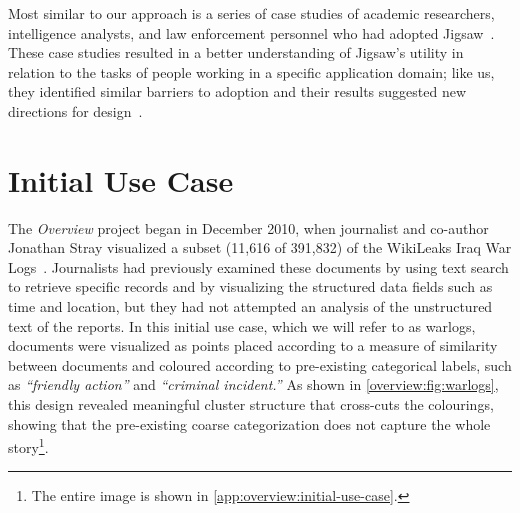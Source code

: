 Most similar to our approach is a series of case studies of academic researchers, intelligence analysts, and law enforcement personnel who had adopted Jigsaw~\cite{Kang2012}.
These case studies resulted in a better understanding of Jigsaw's utility in relation to the tasks of people working in a specific application domain; like us, they identified similar barriers to adoption and their results suggested new directions for design~\cite{Gorg2013,Gorg2014}.


\section{Initial Use Case}
\label{overview:motivation}


The {\it Overview} project began in December 2010, when journalist and co-author Jonathan Stray visualized a subset (11,616 of 391,832) of the WikiLeaks Iraq War Logs~\cite{Stray2010}.
Journalists had previously examined these documents by using text search to retrieve specific records and by visualizing the structured data fields such as time and location, but they had not attempted an analysis of the unstructured text of the reports.
In this initial use case, which we will refer to as {\sc warlogs}, documents were visualized as points placed according to a measure of similarity between documents and coloured according to pre-existing categorical labels, such as {\it ``friendly action''} and {\it ``criminal incident.''}  As shown in \autoref{overview:fig:warlogs}, this design revealed meaningful cluster structure that cross-cuts the colourings, showing that the pre-existing coarse categorization does not capture the whole story\footnote{The entire image is shown in \autoref{app:overview:initial-use-case}.}.



